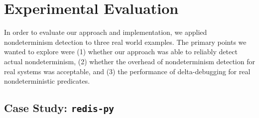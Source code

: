 \section{Experimental Evaluation}

In order to evaluate our approach and implementation, we applied
nondeterminism detection to three real world examples.  The primary
points we wanted to explore were (1) whether our approach was able to reliably detect actual
nondeterminism, (2) whether the overhead of nondeterminism
detection for real systems was acceptable, and (3) the performance of
delta-debugging for real nondeterministic predicates.

\subsection {Case Study: {\tt redis-py}}


